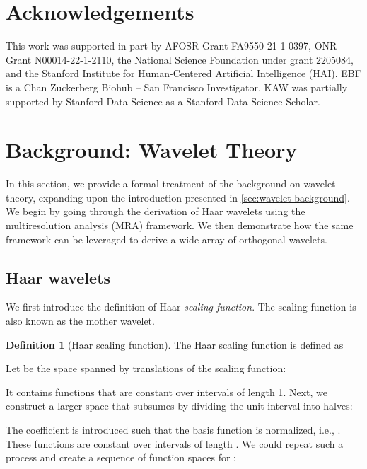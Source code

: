 \documentclass{article}
\theoremstyle{plain}
\theoremstyle{definition}
\newtheorem{definition}[theorem]{Definition}
\theoremstyle{remark}
\begin{document}
\section*{Acknowledgements}



This work was supported in part by AFOSR Grant FA9550-21-1-0397, ONR Grant N00014-22-1-2110, the National Science Foundation under grant 2205084, and the Stanford Institute for Human-Centered Artificial Intelligence (HAI). EBF is a Chan Zuckerberg Biohub – San Francisco Investigator.
KAW was partially supported by Stanford Data Science as a Stanford Data Science Scholar.






\clearpage
\appendix
\onecolumn



\section{Background: Wavelet Theory}
\label{app:wavelets}

In this section, we provide a formal treatment of the background on wavelet theory, expanding upon the introduction presented in \cref{sec:wavelet-background}.
We begin by going through the derivation of Haar wavelets using the multiresolution analysis (MRA) framework. 
We then demonstrate how the same framework can be leveraged to derive a wide array of orthogonal wavelets.   

\subsection{Haar wavelets}
\label{app:haar-wavelets}

We first introduce the definition of Haar \emph{scaling function}. 
The scaling function is also known as the mother wavelet.

\begin{definition}[Haar scaling function]
The Haar scaling function is defined as

\end{definition}
Let  be the space spanned by translations of the scaling function:

It contains functions that are constant over intervals of length 1.
Next, we construct a larger space  that subsumes  by dividing the unit interval into halves:

The coefficient  is introduced such that the basis function  is normalized, i.e., . 
These functions are constant over intervals of length . 
We could repeat such a process and create a sequence of function spaces for :
\end{document}
